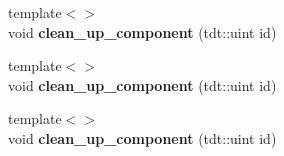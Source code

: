 \begin{DoxyCompactItemize}
\item 
{\footnotesize template$<$$>$ }\\void {\bfseries clean\+\_\+up\+\_\+component} (tdt\+::uint id)\hypertarget{class_entity_system_a65dfc1efc2561a48999d82377cf22bfa}{}\label{class_entity_system_a65dfc1efc2561a48999d82377cf22bfa}

\item 
{\footnotesize template$<$$>$ }\\void {\bfseries clean\+\_\+up\+\_\+component} (tdt\+::uint id)\hypertarget{class_entity_system_a65dfc1efc2561a48999d82377cf22bfa}{}\label{class_entity_system_a65dfc1efc2561a48999d82377cf22bfa}

\item 
{\footnotesize template$<$$>$ }\\void {\bfseries clean\+\_\+up\+\_\+component} (tdt\+::uint id)\hypertarget{class_entity_system_a65dfc1efc2561a48999d82377cf22bfa}{}\label{class_entity_system_a65dfc1efc2561a48999d82377cf22bfa}

\end{DoxyCompactItemize}
